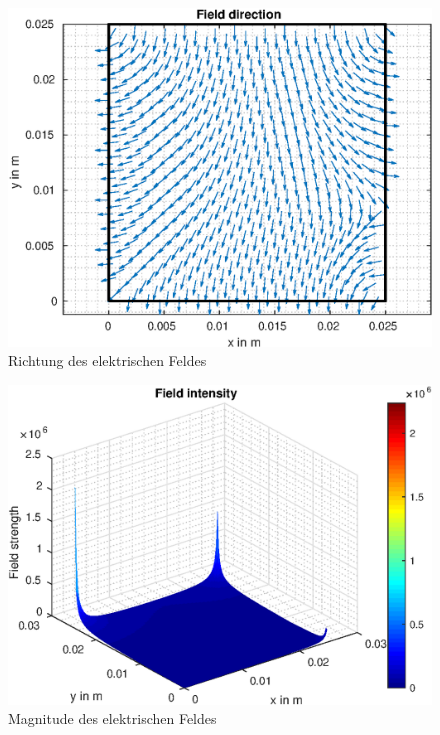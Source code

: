 \begin{figure}[H]
	\centering
	\includegraphics[scale=1]{pics/Bsp_1_b/fig_3.eps}
	\caption{Richtung des elektrischen Feldes}
\end{figure}

\begin{figure}[H]
	\centering
	\includegraphics[scale=1]{pics/Bsp_1_b/fig_4.eps}
	\caption{Magnitude des elektrischen Feldes}
	\label{fig:mag_E_2}
\end{figure}


